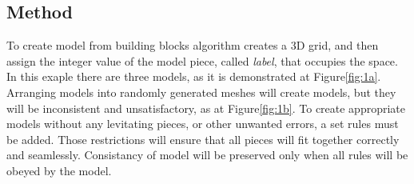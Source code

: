 \documentclass[b5paper,twoside,11pt]{article}
\renewcommand{\figurename}{Figure}
\begin{document}
 \subsection{Method}
To create model from building blocks algorithm creates a 3D grid, and then assign the integer value of the model piece, called \textit{label}, that occupies the space. In this exaple there are three models, as it is demonstrated at \figurename\ref{fig:1a}.
Arranging models into randomly generated meshes will create models, but they will be inconsistent and unsatisfactory, as at \figurename\ref{fig:1b}. To create appropriate models without any levitating pieces, or other unwanted errors, a set rules must be added. Those restrictions will ensure that all pieces will fit together correctly and seamlessly. Consistancy of model will be preserved only when all rules will be obeyed by the model.
\end{document}
